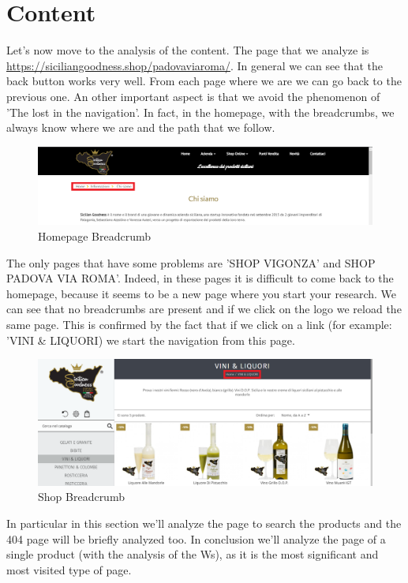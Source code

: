 \section{Content}

Let's now move to the analysis of the content.
The page that we analyze is \url{https://siciliangoodness.shop/padovaviaroma/}. 
In general we can see that the back button works very well. From each page where we are we can go back to the previous one.
An other important aspect is that we avoid the phenomenon of 'The lost in the navigation'. In fact, in the homepage, with the breadcrumbs, we always know where we are and the path that we follow. 

\begin{figure}[H]
	\centering\includegraphics[width=12cm]{Img/bred2.png}
	\caption{Homepage Breadcrumb}
\end{figure}

The only pages that have some problems are 'SHOP VIGONZA' and SHOP PADOVA VIA ROMA'. Indeed, in these pages it is difficult to come back to the homepage, because it seems to be a new page where you start your research. We can see that no breadcrumbs are present and if we click on the logo we reload the same page. This is confirmed by the fact that if we click on a link (for example: 'VINI \& LIQUORI) we start the navigation from this page.

\begin{figure}[H]
	\centering\includegraphics[width=12cm]{Img/bred1.png}
	\caption{Shop Breadcrumb}
\end{figure} 

In particular in this section we'll analyze the page to search the products and the 404 page will be briefly analyzed too. In conclusion we'll analyze the page of a single product (with the analysis of the Ws), as it is the most significant and most visited type of page.

